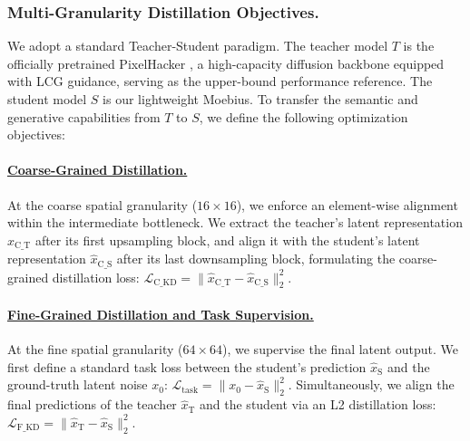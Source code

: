 \documentclass[runningheads]{llncs}
\begin{document}
\vspace{-0.5em}
\vspace{-0.9em}
\subsubsection{Multi-Granularity Distillation Objectives.}
We adopt a standard Teacher-Student paradigm. The teacher model $T$ is the officially pretrained PixelHacker \cite{xu2025pixelhacker}, a high-capacity diffusion backbone equipped with LCG guidance, serving as the upper-bound performance reference. The student model $S$ is our lightweight Moebius. To transfer the semantic and generative capabilities from $T$ to $S$, we define the following optimization objectives:

\vspace{-0.5em}
\vspace{-0.9em}
\paragraph{\underline{Coarse-Grained Distillation.}}
At the coarse spatial granularity ($16\times16$), we enforce an element-wise alignment within the intermediate bottleneck. We extract the teacher's latent representation $\hat{x}_\mathrm{C\_T}$ after its first upsampling block, and align it with the student's latent representation $\hat{x}_\mathrm{C\_S}$ after its last downsampling block, formulating the coarse-grained distillation loss: $\mathcal{L}_\mathrm{C\_KD} = \| \hat{x}_\mathrm{C\_T} - \hat{x}_\mathrm{C\_S} \|^2_2$.

\vspace{-0.5em}
\vspace{-0.5em}
\paragraph{\underline{Fine-Grained Distillation and Task Supervision.}}
At the fine spatial granularity ($64\times64$), we supervise the final latent output. We first define a standard task loss between the student's prediction $\hat{x}_\mathrm{S}$ and the ground-truth latent noise $x_0$: $\mathcal{L}_\mathrm{task} =  \| x_0 - \hat{x}_\mathrm{S} \|^2_2$.
Simultaneously, we align the final predictions of the teacher $\hat{x}_\mathrm{T}$ and the student via an L2 distillation loss: $\mathcal{L}_\mathrm{F\_KD} = \| \hat{x}_\mathrm{T} - \hat{x}_\mathrm{S} \|^2_2$.

\vspace{-0.5em}
\vspace{-0.25em}
\end{document}
